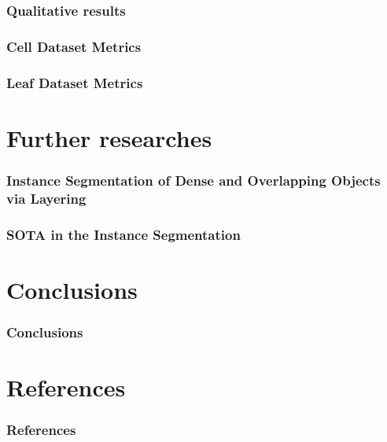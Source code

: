 \documentclass{beamer}
\begin{document}
\begin{frame}
    \frametitle{Qualitative results }



\end{frame}

\begin{frame}
    \frametitle{Cell Dataset Metrics}



\end{frame}

\begin{frame}
    \frametitle{Leaf Dataset Metrics}



\end{frame}

\section{Further researches}

\begin{frame}
    \frametitle{Instance Segmentation of Dense and Overlapping Objects via Layering}



\end{frame}

\begin{frame}
    \frametitle{SOTA in the Instance Segmentation}

\end{frame}

\section*{Conclusions}
\begin{frame}
    \frametitle{Conclusions}



\end{frame}

\section*{References}

\begin{frame}[allowframebreaks]
    \frametitle{References}

    
    
\end{frame}
\end{document}
